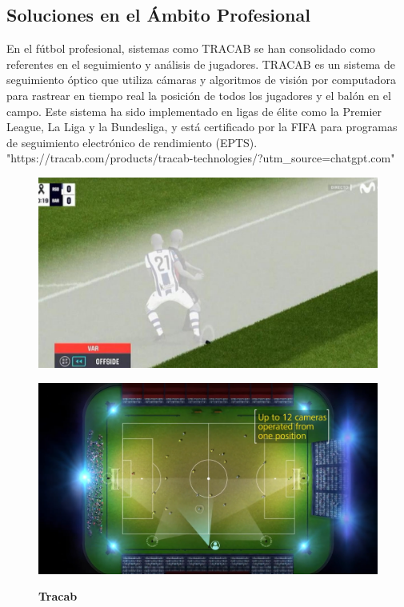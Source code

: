\documentclass[12pt, a4paper, twoside]{article}
\begin{document}
	\subsection{Soluciones en el Ámbito Profesional}
	
	En el fútbol profesional, sistemas como TRACAB se han consolidado como referentes en el seguimiento y análisis de jugadores. TRACAB es un sistema de seguimiento óptico que utiliza cámaras y algoritmos de visión por computadora para rastrear en tiempo real la posición de todos los jugadores y el balón en el campo. Este sistema ha sido implementado en ligas de élite como la Premier League, La Liga y la Bundesliga, y está certificado por la FIFA para programas de seguimiento electrónico de rendimiento (EPTS). "https://tracab.com/products/tracab-technologies/?utm\_source=chatgpt.com"
	
	\begin{figure}[H]
		\centering
		\begin{minipage}{0.45\textwidth} %
			\centering
			\includegraphics[width=\textwidth]{image/tracab}
			\label{tracab}
		\end{minipage}
		\hfill
		\begin{minipage}{0.45\textwidth} %
			\centering
			\includegraphics[width=\textwidth]{image/tracab2}
			\label{tracab2}
		\end{minipage}
		\caption{\textbf{Tracab}}
	\end{figure}
	
\end{document}
